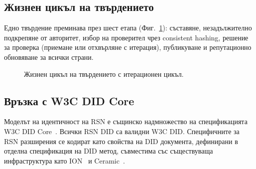 \documentclass[11pt,a4paper,twocolumn]{article}
\begin{document}
\subsection{Жизнен цикъл на твърдението}

Едно твърдение преминава през шест етапа (Фиг.~\ref{fig:lifecycle}): съставяне, незадължително подкрепяне от авторитет, избор на проверител чрез consistent hashing, решение за проверка (приемане или отхвърляне с итерация), публикуване и репутационно обновяване за всички страни.

\begin{figure}[ht]
\centering
{}
\caption{Жизнен цикъл на твърдението с итерационен цикъл.}
\label{fig:lifecycle}
\end{figure}

\subsection{Връзка с W3C DID Core}

Моделът на идентичност на RSN е същинско надмножество на спецификацията W3C DID Core~\cite{did2022}. Всички RSN DID са валидни W3C DID. Специфичните за RSN разширения се кодират като свойства на DID документа, дефинирани в отделна спецификация на DID метод, съвместима със съществуваща инфраструктура като ION~\cite{buchner2021} и Ceramic~\cite{ceramic2023}.

\end{document}
